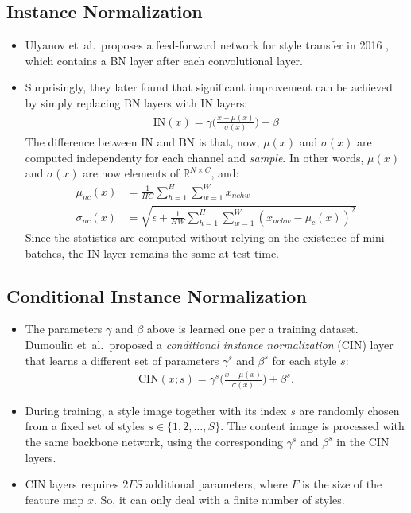 \documentclass[10pt]{article}
\newcommand{\etal}{{et~al.}}
\begin{document}
  \subsection{Instance Normalization}

  \begin{itemize}
  	\item Ulyanov \etal\ proposes a feed-forward network for style transfer in 2016 \cite{Ulyanov:2016}, which contains a BN layer after each convolutional layer.

  	\item Surprisingly, they later found that significant improvement can be achieved by simply replacing BN layers with IN layers:
  	\begin{align*}
  		\mathrm{IN}(x) = \gamma \bigg( \frac{x - \mu(x)}{\sigma(x)} \bigg) + \beta
  	\end{align*}
  	The difference between IN and BN is that, now, $\mu(x)$ and $\sigma(x)$ are computed independenty for each channel and \emph{sample}. In other words, $\mu(x)$ and $\sigma(x)$ are now elements of $\mathbb{R}^{N \times C}$, and:
  	\begin{align*}
  		\mu_{nc}(x) &= \frac{1}{HC} \sum_{h=1}^H \sum_{w=1}^W x_{nchw} \\
  		\sigma_{nc}(x)
  			&= \sqrt{\epsilon + \frac{1}{HW} \sum_{h=1}^H \sum_{w=1}^W (x_{nchw} - \mu_c(x))^2 }
  	\end{align*}
  	Since the statistics are computed without relying on the existence of mini-batches, the IN layer remains the same at test time.  	
  \end{itemize}

  \subsection{Conditional Instance Normalization}

  \begin{itemize}
  	\item The parameters $\gamma$ and $\beta$ above is learned one per a training dataset. Dumoulin \etal\ proposed a \emph{conditional instance normalization} (CIN) layer that learns a different set of parameters $\gamma^s$ and $\beta^s$ for each style $s$:
  	\begin{align*}
  		\mathrm{CIN}(x;s) = \gamma^s \bigg( \frac{x - \mu(x)}{\sigma(x)} \bigg) + \beta^s.
  	\end{align*}

  	\item During training, a style image together with its index $s$ are randomly chosen from a fixed set of styles $s \in \{ 1,2,\dotsc,S\}$. The content image is processed with the same backbone network, using the corresponding $\gamma^s$ and $\beta^s$ in the CIN layers.

  	\item CIN layers requires $2FS$ additional parameters, where $F$ is the size of the feature map $x$. So, it can only deal with a finite number of styles.
  \end{itemize}
\end{document}
